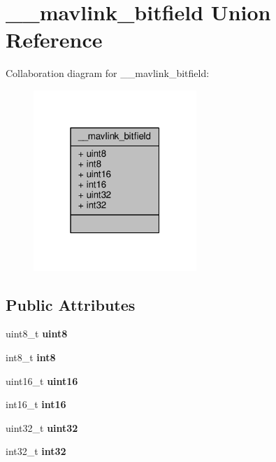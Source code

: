 \hypertarget{union____mavlink__bitfield}{\section{\+\_\+\+\_\+mavlink\+\_\+bitfield Union Reference}
\label{union____mavlink__bitfield}
}


Collaboration diagram for \+\_\+\+\_\+mavlink\+\_\+bitfield\+:
\nopagebreak
\begin{figure}[H]
\begin{center}
\leavevmode
\includegraphics[width=175pt]{union____mavlink__bitfield__coll__graph}
\end{center}
\end{figure}
\subsection*{Public Attributes}
\begin{DoxyCompactItemize}
\item 
\hypertarget{union____mavlink__bitfield_ade669a5f63c53f0d61f636eff94417c0}{uint8\+\_\+t {\bfseries uint8}}\label{union____mavlink__bitfield_ade669a5f63c53f0d61f636eff94417c0}

\item 
\hypertarget{union____mavlink__bitfield_a50a846d427d7a1d7dc79235c87597622}{int8\+\_\+t {\bfseries int8}}\label{union____mavlink__bitfield_a50a846d427d7a1d7dc79235c87597622}

\item 
\hypertarget{union____mavlink__bitfield_a0ca76ce4a09ee26387e50b6702c17894}{uint16\+\_\+t {\bfseries uint16}}\label{union____mavlink__bitfield_a0ca76ce4a09ee26387e50b6702c17894}

\item 
\hypertarget{union____mavlink__bitfield_a99cd7f966d8a59b29d05197b39c5b229}{int16\+\_\+t {\bfseries int16}}\label{union____mavlink__bitfield_a99cd7f966d8a59b29d05197b39c5b229}

\item 
\hypertarget{union____mavlink__bitfield_ab43ed56310c2d778ebaa7a5a21cb6587}{uint32\+\_\+t {\bfseries uint32}}\label{union____mavlink__bitfield_ab43ed56310c2d778ebaa7a5a21cb6587}

\item 
\hypertarget{union____mavlink__bitfield_a07bd702e8b91679a25e632ad90d0a1ec}{int32\+\_\+t {\bfseries int32}}\label{union____mavlink__bitfield_a07bd702e8b91679a25e632ad90d0a1ec}

\end{DoxyCompactItemize}


